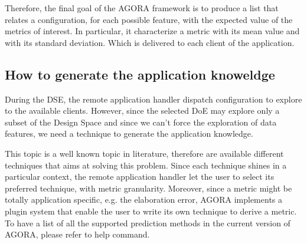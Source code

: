 Therefore, the final goal of the AGORA framework is to produce a list that relates a configuration, for each possible feature, with the expected value of the metrics of interest.
In particular, it characterize a metric with its mean value and with its standard deviation.
Which is delivered to each client of the application.


\subsection{How to generate the application knoweldge}

During the DSE, the remote application handler dispatch configuration to explore to the available clients.
However, since the selected DoE may explore only a subset of the Design Space and since we can't force the exploration of data features, we need a technique to generate the application knowledge.

This topic is a well known topic in literature, therefore are available different techniques that aims at solving this problem.
Since each technique shines in a particular context, the remote application handler let the user to select its preferred technique, with metric granularity.
Moreover, since a metric might be totally application specific, e.g. the elaboration error, AGORA implements a plugin system that enable the user to write its own technique to derive a metric.
To have a list of all the supported prediction methods in the current version of AGORA, please refer to help command.
